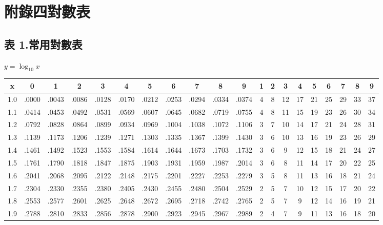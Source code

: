 \section*{附錄四\quad 對數表}
\label{sec:b4_a4}

\subsection*{表 1.\quad 常用對數表}
\begin{center} $y = \log_{10} x$ \end{center}
{\centering\fontsize{7.5pt}{8.8pt}\selectfont\setlength{\tabcolsep}{1.5pt}\renewcommand{\arraystretch}{0.96}
\begin{tabular}{|c|cccccccccc|ccccccccc|}
\hline
x & 0 & 1 & 2 & 3 & 4 & 5 & 6 & 7 & 8 & 9 & 1 & 2 & 3 & 4 & 5 & 6 & 7 & 8 & 9 \\ \hline
1.0 & .0000 & .0043 & .0086 & .0128 & .0170 & .0212 & .0253 & .0294 & .0334 & .0374 & 4 & 8 & 12 & 17 & 21 & 25 & 29 & 33 & 37 \\
1.1 & .0414 & .0453 & .0492 & .0531 & .0569 & .0607 & .0645 & .0682 & .0719 & .0755 & 4 & 8 & 11 & 15 & 19 & 23 & 26 & 30 & 34 \\
1.2 & .0792 & .0828 & .0864 & .0899 & .0934 & .0969 & .1004 & .1038 & .1072 & .1106 & 3 & 7 & 10 & 14 & 17 & 21 & 24 & 28 & 31 \\
1.3 & .1139 & .1173 & .1206 & .1239 & .1271 & .1303 & .1335 & .1367 & .1399 & .1430 & 3 & 6 & 10 & 13 & 16 & 19 & 23 & 26 & 29 \\
1.4 & .1461 & .1492 & .1523 & .1553 & .1584 & .1614 & .1644 & .1673 & .1703 & .1732 & 3 & 6 & 9 & 12 & 15 & 18 & 21 & 24 & 27 \\
1.5 & .1761 & .1790 & .1818 & .1847 & .1875 & .1903 & .1931 & .1959 & .1987 & .2014 & 3 & 6 & 8 & 11 & 14 & 17 & 20 & 22 & 25 \\
1.6 & .2041 & .2068 & .2095 & .2122 & .2148 & .2175 & .2201 & .2227 & .2253 & .2279 & 3 & 5 & 8 & 11 & 13 & 16 & 18 & 21 & 24 \\
1.7 & .2304 & .2330 & .2355 & .2380 & .2405 & .2430 & .2455 & .2480 & .2504 & .2529 & 2 & 5 & 7 & 10 & 12 & 15 & 17 & 20 & 22 \\
1.8 & .2553 & .2577 & .2601 & .2625 & .2648 & .2672 & .2695 & .2718 & .2742 & .2765 & 2 & 5 & 7 & 9 & 12 & 14 & 16 & 19 & 21 \\
1.9 & .2788 & .2810 & .2833 & .2856 & .2878 & .2900 & .2923 & .2945 & .2967 & .2989 & 2 & 4 & 7 & 9 & 11 & 13 & 16 & 18 & 20 \\

\end{tabular}}
